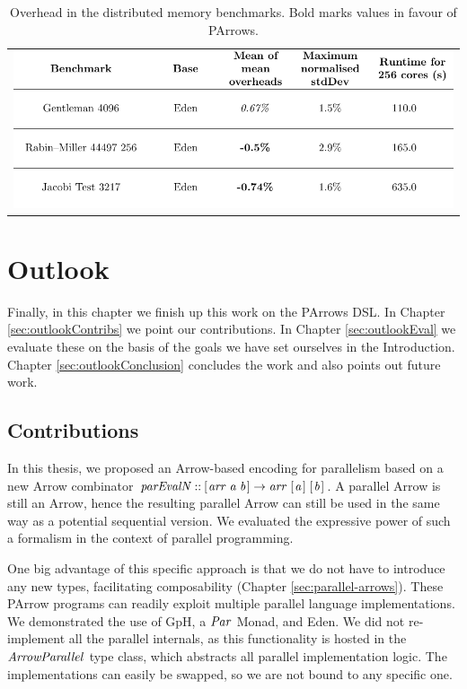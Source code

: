 \documentclass[paper=A4,twoside=true,openright,parskip=full,chapterprefix=true,headings=normal,bibliography=totoc,listof=totoc,titlepage=on,captions=tableabove,draft=false,british]{scrreprt}%
\begin{document}
\begin{longtable}[]{@{}l@{}}
\caption[Overhead in the distributed memory benchmarks.]{Overhead in the distributed memory benchmarks. Bold marks
values in favour of PArrows.
\label{tbl:meanOverHeadDistributedMemory}}\tabularnewline
\includegraphics{src/img/bestAndWorstBenchmarks2.pdf}\tabularnewline
\end{longtable}

\hypertarget{outlook}{%
\chapter{Outlook}\label{outlook}}

\label{sec:outlook}

Finally, in this chapter we finish up this work on the PArrows DSL. In
Chapter \ref{sec:outlookContribs} we point our contributions. In Chapter
\ref{sec:outlookEval} we evaluate these on the basis of the goals we
have set ourselves in the Introduction. Chapter
\ref{sec:outlookConclusion} concludes the work and also points out
future work.

\hypertarget{contributions}{%
\section{Contributions}\label{contributions}}

\label{sec:outlookContribs}

In this thesis, we proposed an Arrow-based encoding for parallelism
based on a new Arrow combinator \ensuremath{\Varid{parEvalN}\mathbin{::}[\mskip1.5mu \Varid{arr}\;\Varid{a}\;\Varid{b}\mskip1.5mu]\to \Varid{arr}\;[\mskip1.5mu \Varid{a}\mskip1.5mu]\;[\mskip1.5mu \Varid{b}\mskip1.5mu]}.
A parallel Arrow is still an Arrow, hence the resulting parallel Arrow
can still be used in the same way as a potential sequential version. We
evaluated the expressive power of such a formalism in the context of
parallel programming.

One big advantage of this specific approach is that we do not have to
introduce any new types, facilitating composability (Chapter
\ref{sec:parallel-arrows}). These PArrow programs can readily exploit
multiple parallel language implementations. We demonstrated the use of
GpH, a \ensuremath{\Conid{Par}} Monad, and Eden. We did not re-implement all the parallel
internals, as this functionality is hosted in the \ensuremath{\Conid{ArrowParallel}} type
class, which abstracts all parallel implementation logic. The
implementations can easily be swapped, so we are not bound to any
specific one.
\end{document}
